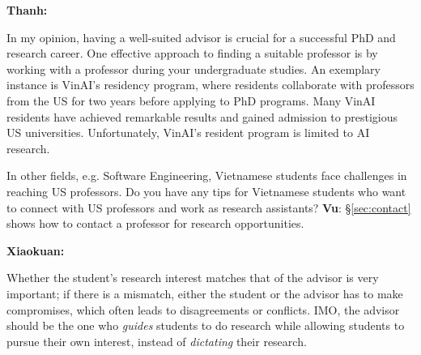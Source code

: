 \documentclass[11pt]{article}
\newenvironment{commentbox}[1][]{
\small
    \begin{cbox}
    \textbf{#1} 
 }{
   \end{cbox}
}
\begin{document}
\begin{commentbox}[Thanh:]
    In my opinion, having a well-suited advisor is crucial for a successful PhD and research career. One effective approach to finding a suitable professor is by working with a professor during your undergraduate studies. An exemplary instance is VinAI's residency program, where residents collaborate with professors from the US for two years before applying to PhD programs. Many VinAI residents have achieved remarkable results and gained admission to prestigious US universities. Unfortunately, VinAI's resident program is limited to AI research. 
    
    In other fields, e.g. Software Engineering, Vietnamese students face challenges in reaching US professors. Do you have any tips for Vietnamese students who want to connect with US professors and work as research assistants? \textbf{Vu}: \S\ref{sec:contact} shows how to contact a professor for research opportunities.
    \end{commentbox}

\begin{commentbox}[Xiaokuan:]
Whether the student's research interest matches that of the advisor is very important;
if there is a mismatch,
either the student or the advisor has to make compromises,
which often leads to disagreements or conflicts. 
IMO, the advisor should be the one who {\it guides}  students to do research while allowing students to pursue their own interest,
instead of {\it dictating} their research.

\end{commentbox}
\end{document}
